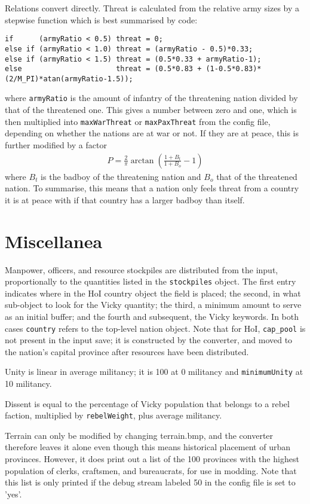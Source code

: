 \documentclass[12pt,ebook,oneside]{book}
\begin{document}
Relations convert directly. Threat is calculated from the relative
army sizes by a stepwise function which is best summarised by code:
\begin{verbatim}
if      (armyRatio < 0.5) threat = 0;
else if (armyRatio < 1.0) threat = (armyRatio - 0.5)*0.33;
else if (armyRatio < 1.5) threat = (0.5*0.33 + armyRatio-1);
else                      threat = (0.5*0.83 + (1-0.5*0.83)*(2/M_PI)*atan(armyRatio-1.5));
\end{verbatim}
where \texttt{armyRatio} is the amount of infantry of the threatening
nation divided by that of the threatened one. This gives a number
between zero and one, which is then multiplied into
\texttt{maxWarThreat} or \texttt{maxPaxThreat} from the config
file, depending on whether the nations are at war or not. If they are
at peace, this is further modified by a factor
\begin{eqnarray*}
P = \frac{2}{\pi}\arctan\left(\frac{1+B_t}{1+B_o}-1\right)
\end{eqnarray*}
where $B_t$ is the badboy of the threatening nation and $B_o$ that of
the threatened nation. To summarise, this means that a nation only
feels threat from a country it is at peace with if that country has a
larger badboy than itself.

\section{Miscellanea}

Manpower, officers, and resource stockpiles are distributed 
from the input, proportionally to the quantities listed in the
\texttt{stockpiles} object. The first entry indicates where in the HoI
country object the field is placed; the second, in what sub-object to
look for the Vicky quantity; the third, a minimum amount to serve as
an initial buffer; and the fourth and subsequent, the Vicky keywords. In both
cases \texttt{country} refers to the top-level nation
object. Note that for HoI, \texttt{cap\_pool} is not present in the
input save; it is constructed by the converter, and moved to the
nation's capital province after resources have been distributed. 

Unity is linear in average militancy; it is 100 at 0 militancy and
\texttt{minimumUnity} at 10 militancy. 

Dissent is equal to the percentage of Vicky population that belongs to a
rebel faction, multiplied by \texttt{rebelWeight}, plus average
militancy. 

Terrain can only be modified by changing terrain.bmp, and the
converter therefore leaves it alone even though this means historical
placement of urban provinces. However, it does print out a list of the
100 provinces with the highest population of clerks, craftsmen, and
bureaucrats, for use in modding. Note that this list is only printed
if the debug stream labeled 50 in the config file is set to 'yes'. 
\end{document}
